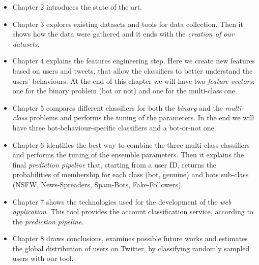 \begin{itemize}
\item[\PencilRight] Chapter 2 introduces the state of the art.

\item[\PencilRight] Chapter 3 explores existing datasets and tools for data collection. Then it shows how the data were gathered and it ends with the \emph{creation of our datasets}.

\item[\PencilRight] Chapter 4 explains the features engineering step. Here we create new features based on users and tweets, that allow the classifiers to better understand the users' behaviours. At the end of this chapter we will have two \emph{feature vectors}: one for the binary problem (bot or not) and one for the multi-class one.

\item[\PencilRight] Chapter 5 compares different classifiers for both the \emph{binary} and the \emph{multi-class} problems and performs the tuning of the parameters. In the end we will have three bot-behaviour-specific classifiers and a bot-or-not one.

\item[\PencilRight] Chapter 6 identifies the best way to combine the three multi-class classifiers and performs the tuning of the ensemble parameters. Then it explains the final \emph{prediction pipeline} that, starting from a user ID, returns the probabilities of membership for each class (bot, genuine) and bots sub-class (NSFW, News-Spreaders, Spam-Bots, Fake-Followers).

\item[\PencilRight] Chapter 7 shows the technologies used for the development of the \emph{web application}. This tool provides the account classification service, according to the \emph{prediction pipeline}.

\item[\PencilRight] Chapter 8 draws conclusions, examines possible future works and estimates the global distribution of users on Twitter, by classifying randomly sampled users with our tool.



\end{itemize}

